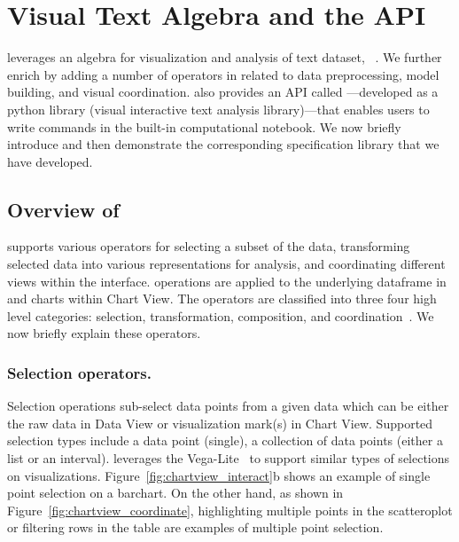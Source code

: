 \section{Visual Text Algebra and the \vital API}
\label{sec:vta}
\system leverages an algebra for visualization and analysis of text dataset, \vta~\cite{rahman2020leam}.
We further enrich \vta by adding a number of operators in \system related to data preprocessing, model building, and visual coordination. \system also provides an API called \vital---developed as a python library (visual interactive text analysis library)---that enables users to write \vta commands in the built-in computational notebook. We now briefly introduce \vta and then demonstrate the corresponding specification library \vital that we have developed.


\subsection{Overview of \vta}
\vta supports various operators for selecting a subset of the data, transforming selected data into various representations for analysis, and coordinating different views within the interface. \vta operations are applied to the underlying dataframe in \system and charts within Chart View. The operators are classified into three four high level categories: selection, transformation, composition, and coordination~\cite{rahman2020leam}. We now briefly explain these operators.

\subsubsection{Selection operators.}
Selection operations sub-select data points from a given data which can be either the raw data in Data View or visualization mark(s) in Chart View. Supported selection types include a data point (single), a collection of data points (either a list or an interval). 
\vta leverages the Vega-Lite~\cite{satyanarayan2016vega} to support similar types of selections on visualizations. Figure~\ref{fig:chartview_interact}b shows an example of single point selection on a barchart. On the other hand, as shown in Figure~\ref{fig:chartview_coordinate}, highlighting multiple points in the scatteroplot or filtering rows in the table are examples of multiple point selection.

